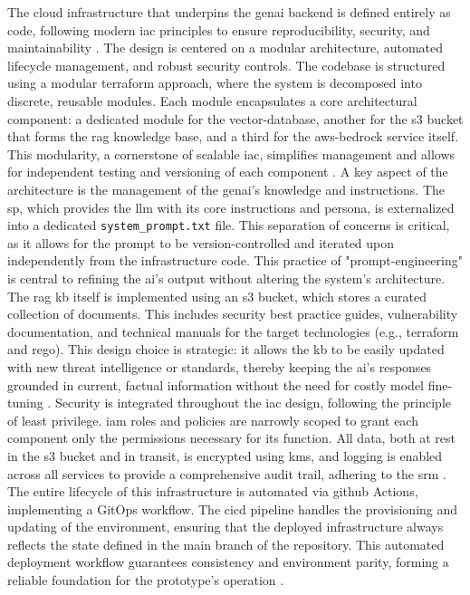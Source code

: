 The cloud infrastructure that underpins the \gls{genai} backend is defined entirely as code, following modern \gls{iac} principles to ensure reproducibility, security, and maintainability \cite{dasari_infrastructure_2025}. The design is centered on a modular architecture, automated lifecycle management, and robust security controls.
The codebase is structured using a modular \gls{terraform} approach, where the system is decomposed into discrete, reusable modules. Each module encapsulates a core architectural component: a dedicated module for the \gls{vector-database}, another for the \gls{s3} bucket that forms the \gls{rag} knowledge base, and a third for the \gls{aws-bedrock} service itself. This modularity, a cornerstone of scalable \gls{iac}, simplifies management and allows for independent testing and versioning of each component \cite{howard_terraform_2022}.
A key aspect of the architecture is the management of the \gls{genai}'s knowledge and instructions. The \gls{sp}, which provides the \gls{llm} with its core instructions and persona, is externalized into a dedicated \texttt{system\_prompt.txt} file. This separation of concerns is critical, as it allows for the prompt to be version-controlled and iterated upon independently from the infrastructure code. This practice of "\gls{prompt-engineering}" is central to refining the \gls{ai}'s output without altering the system's architecture.
The \gls{rag} \gls{kb} itself is implemented using an \gls{s3} bucket, which stores a curated collection of documents. This includes security best practice guides, vulnerability documentation, and technical manuals for the target technologies (e.g., \gls{terraform} and \gls{rego}). This design choice is strategic: it allows the \gls{kb} to be easily updated with new threat intelligence or standards, thereby keeping the \gls{ai}'s responses grounded in current, factual information without the need for costly model fine-tuning \cite{lewis_retrieval-augmented_2021}.
Security is integrated throughout the \gls{iac} design, following the principle of least privilege. \gls{iam} roles and policies are narrowly scoped to grant each component only the permissions necessary for its function. All data, both at rest in the \gls{s3} bucket and in transit, is encrypted using \gls{kms}, and logging is enabled across all services to provide a comprehensive audit trail, adhering to the \gls{srm} \cite{noauthor_aws_nodate}.
The entire lifecycle of this infrastructure is automated via \gls{github} Actions, implementing a GitOps workflow. The \gls{cicd} pipeline handles the provisioning and updating of the environment, ensuring that the deployed infrastructure always reflects the state defined in the main branch of the repository. This automated deployment workflow guarantees consistency and environment parity, forming a reliable foundation for the prototype's operation \cite{Cole_GitOps_2024}.


